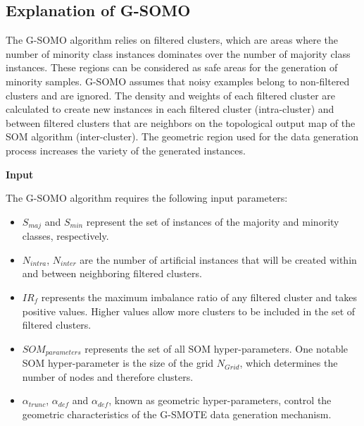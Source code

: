 \documentclass[parskip=full]{scrartcl}
\begin{document}
\subsection{Explanation of G-SOMO}

The G-SOMO algorithm relies on filtered clusters, which are areas where the number of minority class instances dominates over the number of majority class instances. These regions can be considered as safe areas for the generation of minority samples. G-SOMO assumes that noisy examples belong to non-filtered clusters and are ignored. The density and weights of each filtered cluster are calculated to create new instances in each filtered cluster (intra-cluster) and between filtered clusters that are neighbors on the topological output map of the SOM algorithm (inter-cluster). The geometric region used for the data generation process increases the variety of the generated instances.

\textbf{Input}

The G-SOMO algorithm requires the following input parameters:

\begin{itemize}

	\renewcommand\labelitemi{--}

	\item $S_{maj}$ and $S_{min}$ represent the set of instances of the majority and minority classes, respectively.

	\item $N_{intra}$, $N_{inter}$ are the number of artificial instances that will be created within and between neighboring filtered clusters.

	\item $IR_{f}$ represents the maximum imbalance ratio of any filtered cluster and takes positive values. Higher values allow more clusters to be included in the set of filtered clusters.

	\item $SOM_{parameters}$ represents the set of all SOM hyper-parameters. One notable SOM hyper-parameter is the size of the grid $N_{Grid}$, which determines the number of nodes and therefore clusters.

	\item $\alpha_{trunc}$, $\alpha_{def}$ and $\alpha_{def}$, known as geometric hyper-parameters, control the geometric characteristics of the G-SMOTE data generation mechanism.

\end{itemize}
\end{document}
